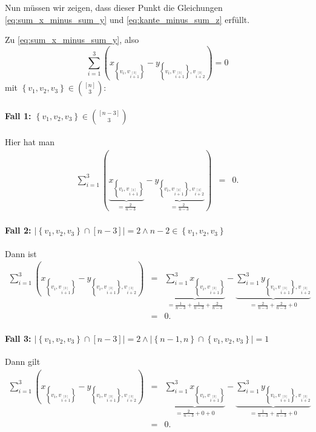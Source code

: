\documentclass[10p,a4paper,BCOR = 12mm, DIV=15]{scrbook}
\begin{document}
\begin{bew}
Nun müssen wir zeigen, dass dieser Punkt die Gleichungen \eqref{eq:sum_x_minus_sum_y} und \eqref{eq:kante_minus_sum_z} erfüllt.

Zu \eqref{eq:sum_x_minus_sum_y}, also
\begin{displaymath}
\sum_{i=1}^3 \left(x_{\left\{v_{i}, v_{i \stackrel{\left[3\right]}{+} 1}\right\}} - y_{\left\{v_{i}, v_{i \stackrel{\left[3\right]}{+} 1}\right\}, v_{i \stackrel{\left[3\right]}{+} 2}}\right) = 0
\end{displaymath}
mit $\left\{v_1, v_2, v_3\right\} \in {\left[n\right] \choose 3}$:

\paragraph{Fall 1: $\left\{v_1, v_2, v_3\right\} \in {\left[n-3\right] \choose 3}$} Hier hat man
\begin{eqnarray*}
\sum_{i=1}^3 \left(\underbrace{x_{\left\{v_{i}, v_{i \stackrel{\left[3\right]}{+} 1}\right\}}}_{= \frac{2}{n-3}} - \underbrace{y_{\left\{v_{i}, v_{i \stackrel{\left[3\right]}{+} 1}\right\}, v_{i \stackrel{\left[3\right]}{+} 2}}}_{= \frac{2}{n-3}}\right) & = & 0.
\end{eqnarray*}

\paragraph{Fall 2: $\left|\left\{v_1, v_2, v_3\right\} \cap \left[n-3\right]\right| = 2 \wedge n-2 \in \left\{v_1, v_2, v_3\right\}$} Dann ist
\begin{eqnarray*}
\sum_{i=1}^3 \left(x_{\left\{v_{i}, v_{i \stackrel{\left[3\right]}{+} 1}\right\}} - y_{\left\{v_{i}, v_{i \stackrel{\left[3\right]}{+} 1}\right\}, v_{i \stackrel{\left[3\right]}{+} 2}}\right) & = & \underbrace{\sum_{i=1}^3 x_{\left\{v_{i}, v_{i \stackrel{\left[3\right]}{+} 1}\right\}}}_{= \frac{1}{n-3} + \frac{1}{n-3} + \frac{2}{n-3}} - \underbrace{\sum_{i=1}^3 y_{\left\{v_{i}, v_{i \stackrel{\left[3\right]}{+} 1}\right\}, v_{i \stackrel{\left[3\right]}{+} 2}}}_{= \frac{2}{n-3} + \frac{2}{n-3} + 0 } \\
& = & 0.
\end{eqnarray*}

\paragraph{Fall 3: $\left|\left\{v_1, v_2, v_3\right\} \cap \left[n-3\right]\right| = 2 \wedge \left|\left\{n-1, n\right\} \cap \left\{v_1, v_2, v_3\right\}\right| = 1$} Dann gilt
\begin{eqnarray*}
\sum_{i=1}^3 \left(x_{\left\{v_{i}, v_{i \stackrel{\left[3\right]}{+} 1}\right\}} - y_{\left\{v_{i}, v_{i \stackrel{\left[3\right]}{+} 1}\right\}, v_{i \stackrel{\left[3\right]}{+} 2}}\right) & = & \underbrace{\sum_{i=1}^3 x_{\left\{v_{i}, v_{i \stackrel{\left[3\right]}{+} 1}\right\}}}_{= \frac{2}{n-3} + 0 + 0} - \underbrace{\sum_{i=1}^3 y_{\left\{v_{i}, v_{i \stackrel{\left[3\right]}{+} 1}\right\}, v_{i \stackrel{\left[3\right]}{+} 2}}}_{= \frac{1}{n-3} + \frac{1}{n-3} + 0 } \\
& = & 0.
\end{eqnarray*}


\end{bew}
\end{document}
